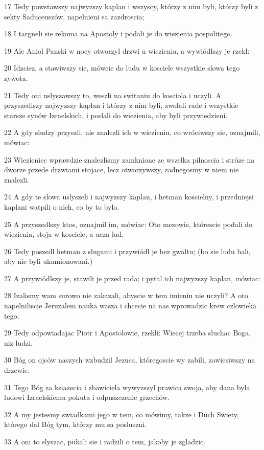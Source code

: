 \par 17 Tedy powstawszy najwyzszy kaplan i wszyscy, którzy z nim byli, którzy byli z sekty Saduceuszów, napelnieni sa zazdroscia;
\par 18 I targneli sie rekoma na Apostoly i podali je do wiezienia pospolitego.
\par 19 Ale Aniol Panski w nocy otworzyl drzwi u wiezienia, a wywiódlszy je rzekl:
\par 20 Idzciez, a stawiwszy sie, mówcie do ludu w kosciele wszystkie slowa tego zywota.
\par 21 Tedy oni uslyszawszy to, weszli na switaniu do kosciola i uczyli. A przyszedlszy najwyzszy kaplan i którzy z nim byli, zwolali rade i wszystkie starsze synów Izraelskich, i poslali do wiezienia, aby byli przywiedzieni.
\par 22 A gdy sludzy przyszli, nie znalezli ich w wiezieniu, co wróciwszy sie, oznajmili, mówiac:
\par 23 Wiezieniec wprawdzie znalezlismy zamknione ze wszelka pilnoscia i stróze na dworze przede drzwiami stojace, lecz otworzywszy, zadnegosmy w niem nie znalezli.
\par 24 A gdy te slowa uslyszeli i najwyzszy kaplan, i hetman koscielny, i przedniejsi kaplani watpili o nich, co by to bylo.
\par 25 A przyszedlszy ktos, oznajmil im, mówiac: Oto mezowie, którescie podali do wiezienia, stoja w kosciele, a ucza lud.
\par 26 Tedy poszedl hetman z slugami i przywiódl je bez gwaltu; (bo sie ludu bali, aby nie byli ukamionowani.)
\par 27 A przywiódlszy je, stawili je przed rada; i pytal ich najwyzszy kaplan, mówiac:
\par 28 Izalismy wam surowo nie zakazali, abyscie w tem imieniu nie uczyli? A oto napelniliscie Jeruzalem nauka wasza i chcecie na nas wprowadzic krew czlowieka tego.
\par 29 Tedy odpowiadajac Piotr i Apostolowie, rzekli: Wiecej trzeba sluchac Boga, niz ludzi.
\par 30 Bóg on ojców naszych wzbudzil Jezusa, któregoscie wy zabili, zawiesiwszy na drzewie.
\par 31 Tego Bóg za ksiazecia i zbawiciela wywyzszyl prawica swoja, aby dana byla ludowi Izraelskiemu pokuta i odpuszczenie grzechów.
\par 32 A my jestesmy swiadkami jego w tem, co mówimy, takze i Duch Swiety, którego dal Bóg tym, którzy mu sa posluszni.
\par 33 A oni to slyszac, pukali sie i radzili o tem, jakoby je zgladzic.
